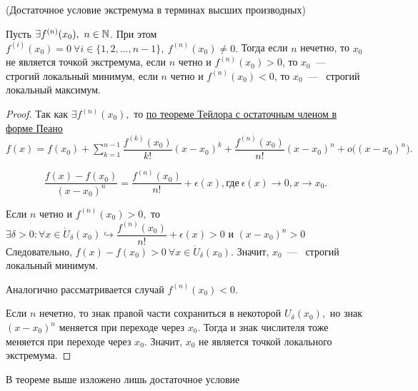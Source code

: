 \begin{theorem}
	\hypertarget{thrm5.23}{(Достаточное условие экстремума в терминах высших производных)} Пусть $\exists f^{(n)}(x_{0}), \ n \in \mathbb{N}$. При этом $f^{(i)} (x_{0}) = 0 \ \forall i \in \{1, 2, \ldots, n-1\}, \
         f^{(n)} (x_{0}) \neq 0.$ Тогда если $n$ нечетно, то $x_{0}$ не является точкой экстремума, если $n$ четно и $f^{(n)}(x_{0}) > 0$, то $x_{0}$~---~ строгий локальный минимум, если $n$ четно и $f^{(n)}(x_{0}) < 0$, то $x_{0}$~---~ строгий локальный максимум.
\end{theorem}
\begin{proof}
	Так как $\exists f^{(n)}(x_{0}),$ то \hyperlink{thrm5.14}{по теореме Тейлора с остаточным членом в форме Пеано} $f(x) = f(x_{0}) + \sum\limits_{k = 1}^{n -1} \dfrac{f^{(k)}(x_{0})}{k!}(x-x_{0})^{k} + \dfrac{f^{(n)}(x_{0})}{n!}(x-x_{0})^{n} + o\Big((x-x_{0})^{n}\Big).$
	
	$$\dfrac{f(x)-f(x_{0})}{(x-x_{0})^{n}} = \dfrac{f^{(n)}(x_{0})}{n!} + \epsilon(x), \textrm{где} \ \epsilon(x) \to 0, x\to x_{0}.$$
	
	Если $n$ четно и $f^{(n)}(x_{0}) > 0,$ то $\exists \delta > 0: \forall  x\in \mathring{U}_{\delta}(x_{0}) \hookrightarrow \dfrac{f^{(n)}(x_{0})}{n!} + \epsilon(x) > 0 $ и $(x-x_{0})^{n} > 0 $ Следовательно, $f(x) - f(x_{0}) > 0\  \forall  x\in \mathring{U}_{\delta}(x_{0})$. Значит, $x_{0}$~---~ строгий локальный минимум.
	
	Аналогично рассматривается случай $f^{(n)}(x_{0}) < 0.$
	
	Если $n$ нечетно, то знак правой части сохраниться в некоторой $U_{\delta}(x_{0}),$ но знак $(x-x_{0})^{n}$ меняется при переходе через $x_{0}.$ Тогда и знак числителя тоже меняется при переходе через $x_{0}.$ Значит, $x_{0}$ не является точкой локального экстремума.
\end{proof}

\begin{note}
	В теореме выше изложено лишь достаточное условие
\end{note}

